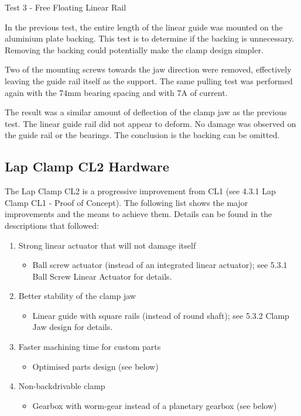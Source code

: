 Test 3 - Free Floating Linear Rail

In the previous test, the entire length of the linear guide was mounted on the aluminium plate backing. This test is to determine if the backing is unnecessary. Removing the backing could potentially make the clamp design simpler.

Two of the mounting screws towards the jaw direction were removed, effectively leaving the guide rail itself as the support. The same pulling test was performed again with the 74mm bearing spacing and with 7A of current.

The result was a similar amount of deflection of the clamp jaw as the previous test. The linear guide rail did not appear to deform. No damage was observed on the guide rail or the bearings. The conclusion is the backing can be omitted.

\subsection{Lap Clamp CL2 Hardware}

The Lap Clamp CL2 is a progressive improvement from CL1 (see 4.3.1 Lap Clamp CL1 - Proof of Concept). The following list shows the major improvements and the means to achieve them. Details can be found in the descriptions that followed:
\begin{enumerate}
\item Strong linear actuator that will not damage itself
    \begin{itemize}
        \item Ball screw actuator (instead of an integrated linear actuator); see 5.3.1 Ball Screw Linear Actuator for details.
    \end{itemize}
    \item Better stability of the clamp jaw 
    \begin{itemize}
        \item Linear guide with square rails (instead of round shaft); see 5.3.2 Clamp Jaw design for details.
    \end{itemize}
    \item Faster machining time for custom parts
    \begin{itemize}
        \item Optimised parts design (see below)
    \end{itemize}
    \item Non-backdrivable clamp
    \begin{itemize}
        \item Gearbox with worm-gear instead of a planetary gearbox (see below)
    \end{itemize}
\end{enumerate}


